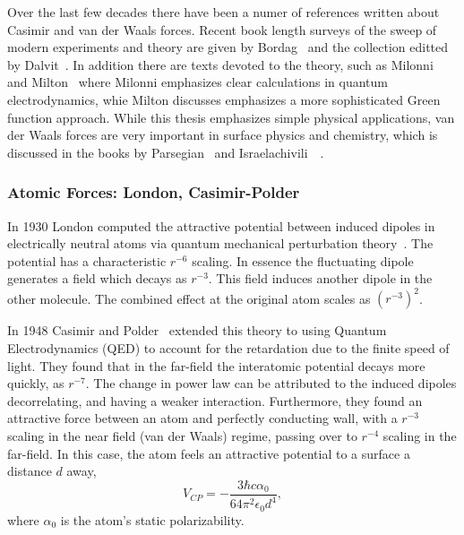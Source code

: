 Over the last few decades there have been a numer of references written about Casimir and 
van der Waals forces. 
Recent book length surveys of the sweep of modern experiments and theory are given by Bordag~\etal\cite{Bordag2009}
and the collection editted by Dalvit~\etal\cite{Dalvit2011}.
In addition there are texts devoted to the theory, such as Milonni~\cite{Milonni1994} and Milton~\cite{Milton2001}
where Milonni emphasizes clear calculations in quantum electrodynamics, whie Milton discusses
emphasizes a more sophisticated Green function approach.
While this thesis emphasizes simple physical applications,
van der Waals forces are very important in surface physics and chemistry, which is discussed 
in the books by Parsegian~\cite{Parsegian2006} and Israelachivili~\etal~\cite{Israelachvili2011}.


\subsubsection{Atomic Forces: London, Casimir-Polder}

In 1930 London computed the attractive potential between induced dipoles in electrically neutral
atoms via quantum mechanical perturbation theory~\cite{London1930}.  The potential has a characteristic $r^{-6}$ scaling.
In essence the fluctuating dipole generates a field which decays as $r^{-3}$.  This field induces another
dipole in the other molecule.  The combined effect at the original atom scales as $(r^{-3})^2$.  

In 1948 Casimir and Polder~\cite{CasimirPolder1948} extended this theory to using Quantum Electrodynamics
(QED) to account for the retardation due to the finite speed of light.  They found that in the 
far-field the interatomic potential decays more quickly, as $r^{-7}$.  The change in power law can be 
attributed to the induced dipoles decorrelating, and having a weaker interaction.  Furthermore,
they found an attractive force between an atom and perfectly conducting wall, with a $r^{-3}$ scaling
in the near field (van der Waals) regime, passing over to $r^{-4}$ scaling in the far-field.    
In this case, the atom feels an attractive potential to a surface a distance $d$ away,
\begin{equation}
  V_{CP} =-\frac{3\hbar c\alpha_0}{64\pi^2\epsilon_0 d^4},
\end{equation}
where $\alpha_0$ is the atom's static polarizability.  

